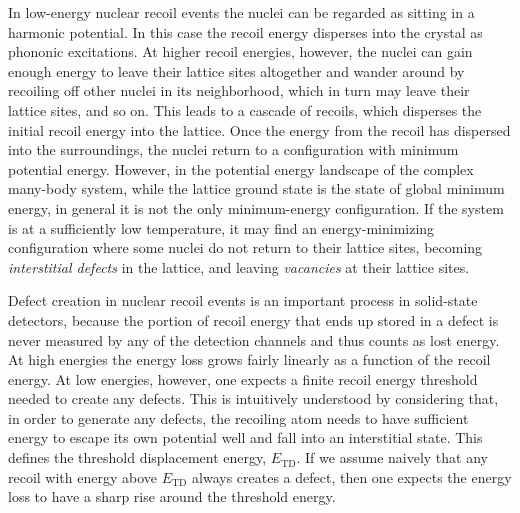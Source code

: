 \documentclass[b5paper, 10pt, twoside]{book}
\begin{document}
In low-energy nuclear recoil events the nuclei can be regarded as sitting in a harmonic potential. In this case the recoil energy disperses into the crystal as phononic excitations. At higher recoil energies, however, the nuclei can gain enough energy to leave their lattice sites altogether and wander around by recoiling off other nuclei in its neighborhood, which in turn may leave their lattice sites, and so on. This leads to a cascade of recoils, which disperses the initial recoil energy into the lattice. Once the energy from the recoil has dispersed into the surroundings, the nuclei return to a configuration with minimum potential energy. However, in the potential energy landscape of the complex many-body system, while the lattice ground state is the state of global minimum energy, in general it is not the only minimum-energy configuration. If the system is at a sufficiently low temperature, it may find an energy-minimizing configuration where some nuclei do not return to their lattice sites, becoming \emph{interstitial defects} in the lattice, and leaving \emph{vacancies} at their lattice sites.

Defect creation in nuclear recoil events is an important process in solid-state detectors, because the portion of recoil energy that ends up stored in a defect is never measured by any of the detection channels and thus counts as lost energy. At high energies the energy loss grows fairly linearly as a function of the recoil energy. At low energies, however, one expects a finite recoil energy threshold needed to create any defects. This is intuitively understood by considering that, in order to generate any defects, the recoiling atom needs to have sufficient energy to escape its own potential well and fall into an interstitial state. This defines the threshold displacement energy, $E_\text{TD}$. If we assume naively that any recoil with energy above $E_\text{TD}$ always creates a defect, then one expects the energy loss to have a sharp rise around the threshold energy.
\end{document}
